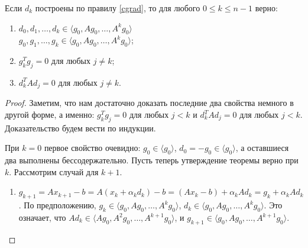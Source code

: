 \documentclass[a4paper, 12pt]{article}
\begin{document}
\begin{Theorem}
Если $d_k$ построены по правилу \eqref{cgrad}, то для любого $0\leq k\leq n-1$ верно:
\begin{enumerate}
    \item $d_0, d_1, \dots, d_k \in \langle g_0, Ag_0, \dots, A^k g_0 \rangle$ \\ $g_0, g_1, \dots, g_k \in \langle g_0, Ag_0, \dots, A^k g_0 \rangle$;
    \item $g_k^Tg_j = 0$ для любых $j \neq k$;
    \item $d_k^TAd_j = 0$ для любых $j \neq k$.
\end{enumerate}
\end{Theorem}
\begin{proof}
Заметим, что нам достаточно доказать последние два свойства немного в другой форме, а именно: $g_k^Tg_j = 0$ для любых $j < k$ и $d_k^TAd_j = 0$ для любых $j < k$. Доказательство будем вести по индукции.

При $k = 0$ первое свойство очевидно: $g_0 \in \langle g_0 \rangle$, $d_0 = -g_0 \in \langle g_0 \rangle$, а оставшиеся два выполнены бессодержательно. Пусть теперь утверждение теоремы верно при $k$. Рассмотрим случай для $k+1$.
\begin{enumerate}
    \item $g_{k+1} = Ax_{k+1} - b = A(x_k + \alpha_kd_k) - b = (Ax_k - b) + \alpha_kAd_k = g_k + \alpha_k Ad_k$. По предположению, $g_k \in \langle g_0, Ag_0, \dots, A^k g_0 \rangle$, $d_k \in \langle g_0, Ag_0, \dots, A^k g_0 \rangle$. Это означает, что $Ad_k \in \langle Ag_0, A^2g_0, \dots, A^{k+1} g_0 \rangle$, и $g_{k+1} \in \langle g_0, Ag_0, \dots, A^{k+1} g_0 \rangle$.
    

\end{enumerate}
\end{proof}
\end{document}

